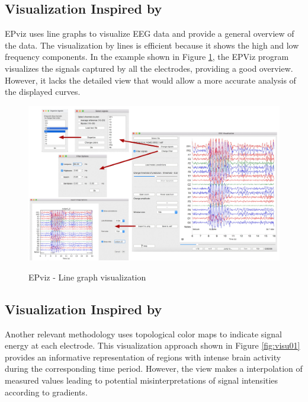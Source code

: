 \documentclass[format=sigconf]{acmart}
\begin{document}
		\subsection{Visualization Inspired by \cite{currey2023epviz}}
			\par EPviz uses line graphs to visualize EEG data \cite{currey2023epviz} and provide a general overview of the data. The visualization by lines is efficient because it shows the high and low frequency components. In the example shown in Figure \ref{fig:epviz00}, the EPViz program visualizes the signals captured by all the electrodes, providing a good overview. However, it lacks the detailed view that would allow a more accurate analysis of the displayed curves.			
		
			\begin{figure}[h]
				\centering
				\caption{EPviz - Line graph visualization}
				\includegraphics[width=\linewidth]{../presentation/images/epviz00}
				\label{fig:epviz00}
			\end{figure}
	
		\subsection{Visualization Inspired by \cite{9098189}}
			\par Another relevant methodology uses topological color maps to indicate signal energy at each electrode. This visualization approach shown in Figure \ref{fig:visu01} provides an informative representation of regions with intense brain activity during the corresponding time period. However, the view makes a interpolation of measured values leading to potential misinterpretations of signal intensities according to gradients.
			
\end{document}
